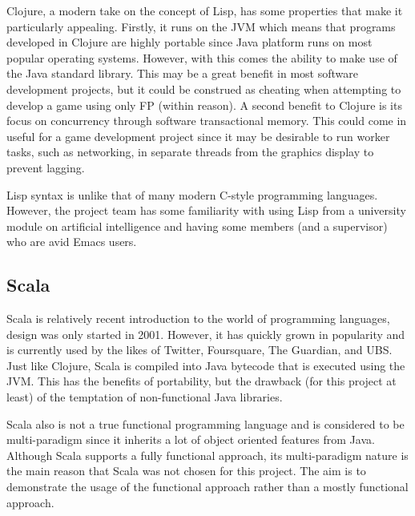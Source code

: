 Clojure, a modern take on the concept of Lisp, has some properties that make it particularly appealing. Firstly, it runs on the JVM which means that programs developed in Clojure are highly portable since Java platform runs on most popular operating systems. However, with this comes the ability to make use of the Java standard library. This may be a great benefit in most software development projects, but it could be construed as cheating when attempting to develop a game using only FP (within reason). A second benefit to Clojure is its focus on concurrency through software transactional memory. This could come in useful for a game development project since it may be desirable to run worker tasks, such as networking, in separate threads from the graphics display to prevent lagging.

Lisp syntax is unlike that of many modern C-style programming languages. However, the project team has some familiarity with using Lisp from a university module on artificial intelligence and having some members (and a supervisor) who are avid Emacs users.

\subsection{Scala}



Scala is relatively recent introduction to the world of programming languages, design was only started in 2001. However, it has quickly grown in popularity and is currently used by the likes of Twitter, Foursquare, The Guardian, and UBS. Just like Clojure, Scala is compiled into Java bytecode that is executed using the JVM. This has the benefits of portability, but the drawback (for this project at least) of the temptation of non-functional Java libraries.

Scala also is not a true functional programming language and is considered to be multi-paradigm since it inherits a lot of object oriented features from Java. Although Scala supports a fully functional approach, its multi-paradigm nature is the main reason that Scala was not chosen for this project. The aim is to demonstrate the usage of the functional approach rather than a mostly functional approach.

